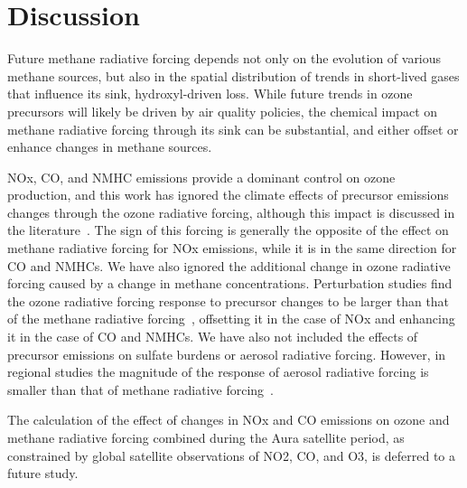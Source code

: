 \section{Discussion}

Future methane radiative forcing depends not only on the evolution of various methane sources, but also in the spatial distribution of trends in short-lived gases that influence its sink, hydroxyl-driven loss. While future trends in ozone precursors will likely be driven by air quality policies, the chemical impact on methane radiative forcing through its sink can be substantial, and either offset or enhance changes in methane sources.

NOx, CO, and NMHC emissions provide a dominant control on ozone production, and this work has ignored the climate effects of precursor emissions changes through the ozone radiative forcing, although this impact is discussed in the literature~\citep{ref:shindell2013}. The sign of this forcing is generally the opposite of the effect on methane radiative forcing for NOx emissions, while it is in the same direction for CO and NMHCs. We have also ignored the additional change in ozone radiative forcing caused by a change in methane concentrations. Perturbation studies find the ozone radiative forcing response to precursor changes to be larger than that of the methane radiative forcing~\citep{ref:akimoto2015}, offsetting it in the case of NOx and enhancing it in the case of CO and NMHCs. We have also not included the effects of precursor emissions on sulfate burdens or aerosol radiative forcing. However, in regional studies the magnitude of the response of aerosol radiative forcing is smaller than that of methane radiative forcing~\citep{ref:fry2012}.

The calculation of the effect of changes in NOx and CO emissions on ozone and methane radiative forcing combined during the Aura satellite period, as constrained by global satellite observations of NO2, CO, and O3, is deferred to a future study. 






